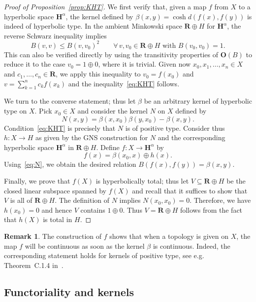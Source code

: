 \documentclass[11pt]{article}
\theoremstyle{definition}
\newtheorem{rema}[theo]{Remark}
\numberwithin{equation}{section}
\numberwithin{figure}{section}
\numberwithin{table}{section}
\newcommand{\sH}{H}
\newcommand{\RR}{\mathbf{R}}
\newcommand{\HH}{\mathbf{H}}
\newcommand{\OO}{{\mathbf O}}
\newcommand{\se}{\subseteq}
\let\oldforall\forall
\renewcommand*{\forall}{\mathrel{\oldforall}}
\begin{document}
\begin{proof}[Proof of Proposition~\ref{prop:KHT}]
We first verify that, given a map $f$ from $X$ to a hyperbolic space $\HH^\alpha$, the kernel defined by $\beta(x,y)=\cosh d(f(x),f(y))$ is indeed of hyperbolic type. In the ambient Minkowski space $\RR\oplus \sH$ for $\HH^\alpha$, the reverse Schwarz inequality implies
\[
B(v, v) \leq B(v, v_0)^2 \qquad \forall\, v, v_0\in \RR\oplus \sH \text{ with } B(v_0, v_0)=1.
\]
This can also be verified directly by using the transitivity properties of $\OO(B)$ to reduce it to the case $v_0=1\oplus 0$, where it is trivial. Given now $x_0, x_1, \ldots, x_n\in X$ and $c_1, \ldots, c_n\in \RR$, we apply this inequality to $v_0 = f(x_0)$ and $v=\sum_{k=1}^n c_k f(x_k)$ and the inequality~\eqref{eq:KHT} follows.

We turn to the converse statement; thus let $\beta$ be an arbitrary kernel of hyperbolic type on $X$. Pick $x_0\in X$ and consider the kernel $N$ on $X$ defined by
\begin{equation}\label{eq:N}
N(x,y) = \beta(x, x_0) \beta(y, x_0) - \beta(x, y).
\end{equation}
Condition~\eqref{eq:KHT} is precisely that $N$ is of positive type. Consider thus $h\colon X\to \sH$ as given by the GNS construction for $N$ and the corresponding hyperbolic space $\HH^\alpha$ in $\RR\oplus\sH$. Define $f\colon X\to \HH^\alpha$ by
\[
f(x) = \beta(x_0, x) \oplus h(x).
\]
Using~\eqref{eq:N}, we obtain the desired relation $B(f(x),f(y))=\beta(x,y)$.

Finally, we prove that $f(X)$ is hyperbolically total; thus let $V\se \RR\oplus\sH$ be the closed linear subspace spanned by $f(X)$ and recall that it suffices to show that $V$ is all of $\RR\oplus\sH$. The definition of $N$ implies $N(x_0, x_0)=0$. Therefore, we have $h(x_0)=0$ and hence $V$ contains $1\oplus 0$. Thus $V=\RR\oplus\sH$ follows from the fact that $h(X)$ is total in $\sH$.
\end{proof}

\begin{rema}\label{rem:GNS}
The construction of $f$ shows that when a topology is given on $X$, the map $f$ will be continuous as soon as the kernel $\beta$ is continuous. Indeed, the corresponding statement holds for kernels of positive type, see e.g. Theorem~C.1.4 in~\cite{Bekka-Harpe-Valette}.
\end{rema}

\subsection{Functoriality and kernels}
\end{document}
